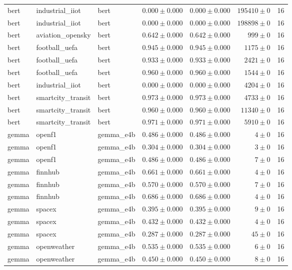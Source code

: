 \begin{table}[htbp]
\begin{tabular}{l l l r r r r}
bert & industrial\_iiot & bert & $0.000\pm0.000$ & $0.000\pm0.000$ & $195410\pm0$ & 16 \\
bert & industrial\_iiot & bert & $0.000\pm0.000$ & $0.000\pm0.000$ & $198898\pm0$ & 16 \\
bert & aviation\_opensky & bert & $0.642\pm0.000$ & $0.642\pm0.000$ & $999\pm0$ & 16 \\
bert & football\_uefa & bert & $0.945\pm0.000$ & $0.945\pm0.000$ & $1175\pm0$ & 16 \\
bert & football\_uefa & bert & $0.933\pm0.000$ & $0.933\pm0.000$ & $2421\pm0$ & 16 \\
bert & football\_uefa & bert & $0.960\pm0.000$ & $0.960\pm0.000$ & $1544\pm0$ & 16 \\
bert & industrial\_iiot & bert & $0.000\pm0.000$ & $0.000\pm0.000$ & $4204\pm0$ & 16 \\
bert & smartcity\_transit & bert & $0.973\pm0.000$ & $0.973\pm0.000$ & $4733\pm0$ & 16 \\
bert & smartcity\_transit & bert & $0.960\pm0.000$ & $0.960\pm0.000$ & $11340\pm0$ & 16 \\
bert & smartcity\_transit & bert & $0.971\pm0.000$ & $0.971\pm0.000$ & $5910\pm0$ & 16 \\
gemma & openf1 & gemma\_e4b & $0.486\pm0.000$ & $0.486\pm0.000$ & $4\pm0$ & 16 \\
gemma & openf1 & gemma\_e4b & $0.304\pm0.000$ & $0.304\pm0.000$ & $3\pm0$ & 16 \\
gemma & openf1 & gemma\_e4b & $0.486\pm0.000$ & $0.486\pm0.000$ & $7\pm0$ & 16 \\
gemma & finnhub & gemma\_e4b & $0.661\pm0.000$ & $0.661\pm0.000$ & $4\pm0$ & 16 \\
gemma & finnhub & gemma\_e4b & $0.570\pm0.000$ & $0.570\pm0.000$ & $7\pm0$ & 16 \\
gemma & finnhub & gemma\_e4b & $0.686\pm0.000$ & $0.686\pm0.000$ & $4\pm0$ & 16 \\
gemma & spacex & gemma\_e4b & $0.395\pm0.000$ & $0.395\pm0.000$ & $9\pm0$ & 16 \\
gemma & spacex & gemma\_e4b & $0.432\pm0.000$ & $0.432\pm0.000$ & $4\pm0$ & 16 \\
gemma & spacex & gemma\_e4b & $0.287\pm0.000$ & $0.287\pm0.000$ & $45\pm0$ & 16 \\
gemma & openweather & gemma\_e4b & $0.535\pm0.000$ & $0.535\pm0.000$ & $6\pm0$ & 16 \\
gemma & openweather & gemma\_e4b & $0.450\pm0.000$ & $0.450\pm0.000$ & $8\pm0$ & 16 \\

\end{tabular}
\end{table}
